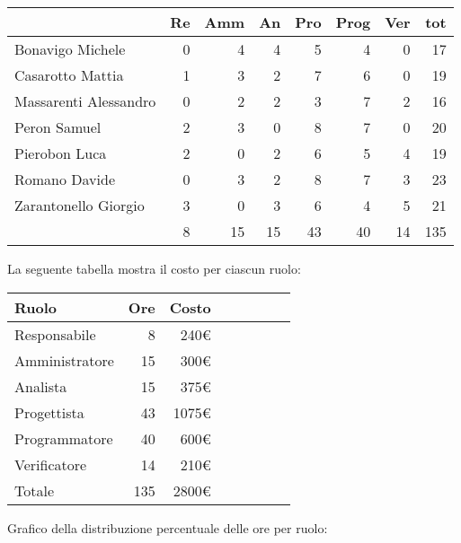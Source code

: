 \begin{table}[H]
    \begin{tabularx}{\linewidth}{X|rrrrrrr}
    \rowcolor{gray!30}& Re & Amm & An & Pro & Prog & Ver & tot \\
    \hline
    Bonavigo Michele                        & 0 & 4 & 4 & 5 & 4 & 0 & 17 \\
    \rowcolor{gray!10}Casarotto Mattia      & 1 & 3 & 2 & 7 & 6 & 0 & 19 \\
    Massarenti Alessandro                   & 0 & 2 & 2 & 3 & 7 & 2 & 16 \\
    \rowcolor{gray!10}Peron Samuel          & 2 & 3 & 0 & 8 & 7 & 0 & 20 \\
    Pierobon Luca                           & 2 & 0 & 2 & 6 & 5 & 4 & 19 \\
    \rowcolor{gray!10}Romano Davide         & 0 & 3 & 2 & 8 & 7 & 3 & 23 \\
    Zarantonello Giorgio                    & 3 & 0 & 3 & 6 & 4 & 5 & 21 \\
    \hline                                  & 8 & 15 & 15 & 43 & 40 & 14 & 135 \\ 
    \end{tabularx}
\end{table}

La seguente tabella mostra il costo per ciascun ruolo:
\begin{table}[H]
    \begin{tabularx}{\linewidth}{X|rrrrrrr}
    \rowcolor{gray!30}Ruolo & Ore & Costo \\
    \hline
    Responsabile                            & 8  & 240€ \\
    \rowcolor{gray!10}Amministratore        & 15  & 300€ \\
    Analista                                & 15  & 375€ \\
    \rowcolor{gray!10}Progettista           & 43  & 1075€ \\
    Programmatore                           & 40  & 600€ \\
    \rowcolor{gray!10}Verificatore          & 14  & 210€ \\
    \hline Totale                           & 135  & 2800€ \\ 
    \end{tabularx}
\end{table}

Grafico della distribuzione percentuale delle ore per ruolo:
\begin{center}
\end{center}

